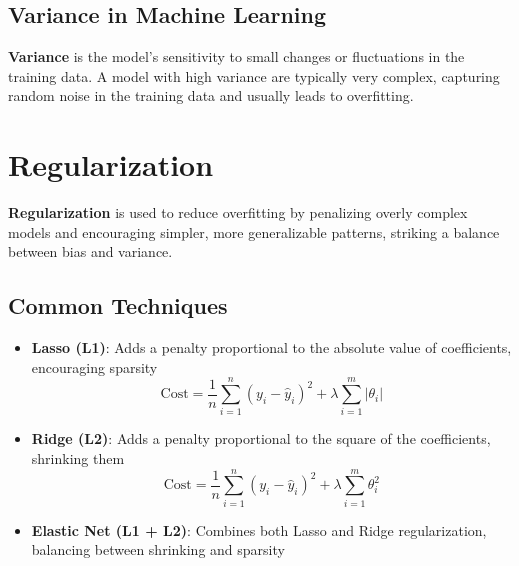 \documentclass{article}
\begin{document}
\subsection*{Variance in Machine Learning}

\textbf{Variance} is the model's sensitivity to small changes or fluctuations in the training data. A model with high variance are typically very complex, capturing random noise in the training data and usually leads to overfitting.

\section*{Regularization}

\textbf{Regularization} is used to reduce overfitting by penalizing overly complex models and encouraging simpler, more generalizable patterns, striking a balance between bias and variance.

\subsection*{Common Techniques}

\begin{itemize}
    \item \textbf{Lasso (L1)}: Adds a penalty proportional to the absolute value of coefficients, encouraging sparsity
    \[\text{Cost}=\frac{1}{n}\sum_{i=1}^n{(y_i-\hat{y}_i)}^2+\lambda\sum_{i=1}^m|\theta_i|\]
    \item \textbf{Ridge (L2)}: Adds a penalty proportional to the square of the coefficients, shrinking them
    \[\text{Cost}=\frac{1}{n}\sum_{i=1}^n{(y_i-\hat{y}_i)}^2+\lambda\sum_{i=1}^m{\theta^2_i}\]
    \item \textbf{Elastic Net (L1 + L2)}: Combines both Lasso and Ridge regularization, balancing between shrinking and sparsity
\end{itemize}
\end{document}
